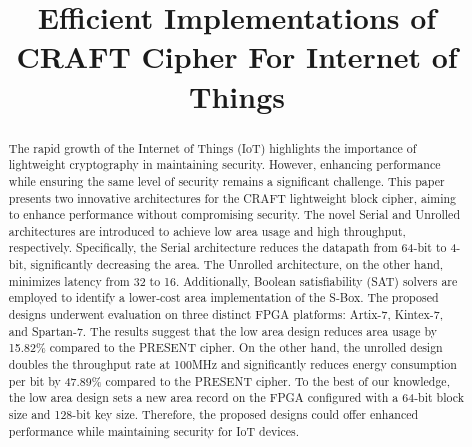 \documentclass[final,5p,times,twocolumn]{elsarticle}
\begin{document}
\begin{frontmatter}

    \title{Efficient Implementations of CRAFT Cipher For Internet of Things }

    








    \begin{abstract}
        The rapid growth of the Internet of Things (IoT) highlights the importance of lightweight cryptography in maintaining security.
        However, enhancing performance while ensuring the same level of security remains a significant challenge.
        This paper presents two innovative architectures for the CRAFT lightweight block cipher, aiming to enhance performance without compromising security.
        The novel Serial and Unrolled architectures are introduced to achieve low area usage and high throughput, respectively.
        Specifically, the Serial architecture reduces the datapath from 64-bit to 4-bit, significantly decreasing the area.
        The Unrolled architecture, on the other hand, minimizes latency from 32 to 16.
        Additionally, Boolean satisfiability (SAT) solvers are employed to identify a lower-cost area implementation of the S-Box.
        The proposed designs underwent evaluation on three distinct FPGA platforms: Artix-7, Kintex-7, and Spartan-7.
        The results suggest that the low area design reduces area usage by 15.82\% compared to the PRESENT cipher.
        On the other hand, the unrolled design doubles the throughput rate at 100MHz and significantly reduces energy consumption per bit by 47.89\% compared to the PRESENT cipher.
        To the best of our knowledge, the low area design sets a new area record on the FPGA configured with a 64-bit block size and 128-bit key size.
        Therefore, the proposed designs could offer enhanced performance while maintaining security for IoT devices.
    \end{abstract}



\end{frontmatter}
\end{document}

